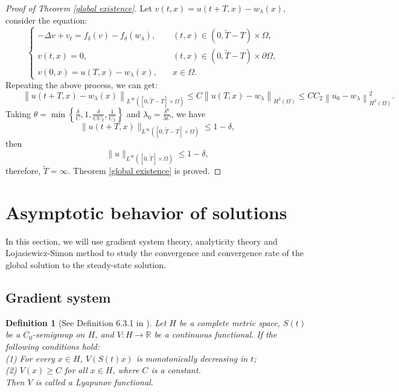 \documentclass{article}
\numberwithin{equation}{section}
\newtheorem{definition}{Definition}[section]
\begin{document}
\begin{proof}[Proof of Theorem \ref{global existence}]
Let $v(t, x)=u(t+T, x)-w_\lambda(x)$, consider the equation:
\begin{equation}
\left\{\begin{array}{lll}
 -\Delta v+v_{t}=f_{\delta}(v)-f_{\delta}\left(w_{\lambda}\right) ,\quad& (t,x) \in (0,  \widetilde{T}-T)\times\Omega,
\\  v(t, x)=0 ,\quad& (t,x) \in (0, \widetilde{T}-T)\times\partial \Omega ,
\\  v(0, x)=u(T, x)-w_{\lambda}(x) ,\quad& x\in \Omega.
\end{array}\quad \right. \label{045}
\end{equation}
Repeating the above process, we can get:
\begin{equation}
\qquad\left\|u(t+T, x)-w_\lambda(x)\right\|_{L^{\infty}([0, \widetilde{T}-T] \times \Omega)} \le C\left\|u(T, x)-w_{\lambda}\right\|_{H^{2}(\Omega)}
\le CC_2\left\|u_{0}-w_{\lambda}\right\|_{H^{2}(\Omega)}^2.\label{046}
\end{equation}
Taking $\theta=\min \left\{\frac{\delta}{C}, 1, \frac{\delta}{CC_2}, \frac{1}{C_2}\right\}$ and $\lambda_{0}=\frac{\delta^6}{3C}$, we have
$$\|u(t+T, x)\|_{L^{\infty}([0, \widetilde{T}-T] \times \Omega)} \le 1-\delta,$$
then
$$\|u\|_{L^{\infty}([0, \widetilde{T}] \times \Omega)} \le 1-\delta,$$
therefore, $\widetilde{T}=\infty$. Theorem \ref{global existence} is proved.
\end{proof}

\section{Asymptotic behavior of solutions}

\qquad In this section, we will use gradient system theory, analyticity theory and Lojasiewicz-Simon method to study the convergence and convergence rate of the global solution to the steady-state solution.

\subsection{Gradient system}

 \begin{definition}[See Definition 6.3.1 in \cite{ref8}]
    Let $H$ be a complete metric space, $S(t)$ be a $C_0$-semigroup on $H$, and $V:H\to \mathbb{R}$ be a continuous functional. If the following conditions hold:\\
    (1) For every $x\in H$, $V(S(t)x)$ is monotonically decreasing in $t$;\\
    (2) $V(x)\ge C$ for all $x\in H$, where $C$ is a constant.\\
    Then $V$ is called a Lyapunov functional.
\end{definition}
\end{document}
